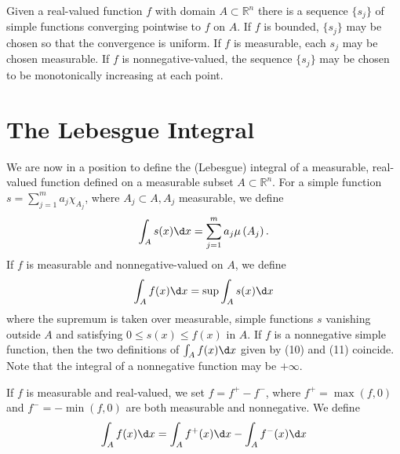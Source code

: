 \begin{theorem}
  Given a real-valued function $f$ with domain $A \subset \mathbb{R}^n$ there is a sequence $\{s_j\}$ of simple functions converging pointwise to $f$ on $A$. If $f$ is bounded, $\{s_j\}$ may be chosen so that the convergence is uniform. If $f$ is measurable, each $s_j$ may be chosen measurable. If $f$ is nonnegative-valued, the sequence $\{s_j\}$ may be chosen to be monotonically increasing at each point.
\end{theorem}


\section{The Lebesgue Integral}

\begin{para}
  We are now in a position to define the (Lebesgue) integral of a measurable, real-valued function defined
  on a measurable subset $A \subset \mathbb{R}^n$. For a simple function $s=\sum_{j=1}^m a_j \chi_{A_j}$,
  where $A_j \subset A, A_j$ measurable, we define
  \[\int_A s(x) \d x=\sum_{j=1}^m a_j \mu\left(A_j\right).\]
  If $f$ is measurable and nonnegative-valued on $A$, we define
  \[\int_A f(x) \d x=\sup \int_A s(x) \d x\]
  where the supremum is taken over measurable, simple functions $s$ vanishing outside $A$ and satisfying $0 \leq s(x) \leq f(x)$ in $A$. If $f$ is a nonnegative simple function, then the two definitions of $\int_A f(x) \d x$ given by (10) and (11) coincide. Note that the integral of a nonnegative function may be $+\infty$.
  
  If $f$ is measurable and real-valued, we set $f=f^{+}-f^{-}$, where $f^{+}=\max (f, 0)$ and $f^{-}=-\min (f, 0)$ are both measurable and nonnegative. We define
  \[
  \int_A f(x) \d x=\int_A f^{+}(x) \d x-\int_A f^{-}(x) \d x
  \]
\end{para}

